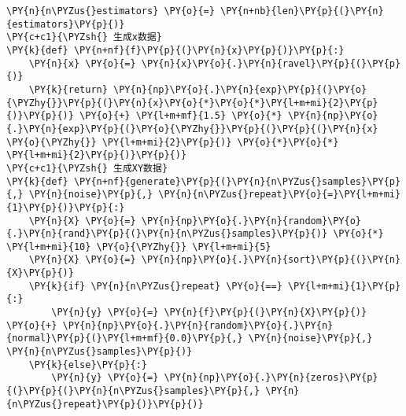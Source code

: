 \begin{Verbatim}[commandchars=\\\{\}]
\PY{n}{n\PYZus{}estimators} \PY{o}{=} \PY{n+nb}{len}\PY{p}{(}\PY{n}{estimators}\PY{p}{)}
\PY{c+c1}{\PYZsh{} 生成x数据}
\PY{k}{def} \PY{n+nf}{f}\PY{p}{(}\PY{n}{x}\PY{p}{)}\PY{p}{:}
    \PY{n}{x} \PY{o}{=} \PY{n}{x}\PY{o}{.}\PY{n}{ravel}\PY{p}{(}\PY{p}{)}
    \PY{k}{return} \PY{n}{np}\PY{o}{.}\PY{n}{exp}\PY{p}{(}\PY{o}{\PYZhy{}}\PY{p}{(}\PY{n}{x}\PY{o}{*}\PY{o}{*}\PY{l+m+mi}{2}\PY{p}{)}\PY{p}{)} \PY{o}{+} \PY{l+m+mf}{1.5} \PY{o}{*} \PY{n}{np}\PY{o}{.}\PY{n}{exp}\PY{p}{(}\PY{o}{\PYZhy{}}\PY{p}{(}\PY{p}{(}\PY{n}{x} \PY{o}{\PYZhy{}} \PY{l+m+mi}{2}\PY{p}{)} \PY{o}{*}\PY{o}{*} \PY{l+m+mi}{2}\PY{p}{)}\PY{p}{)}
\PY{c+c1}{\PYZsh{} 生成XY数据}
\PY{k}{def} \PY{n+nf}{generate}\PY{p}{(}\PY{n}{n\PYZus{}samples}\PY{p}{,} \PY{n}{noise}\PY{p}{,} \PY{n}{n\PYZus{}repeat}\PY{o}{=}\PY{l+m+mi}{1}\PY{p}{)}\PY{p}{:}
    \PY{n}{X} \PY{o}{=} \PY{n}{np}\PY{o}{.}\PY{n}{random}\PY{o}{.}\PY{n}{rand}\PY{p}{(}\PY{n}{n\PYZus{}samples}\PY{p}{)} \PY{o}{*} \PY{l+m+mi}{10} \PY{o}{\PYZhy{}} \PY{l+m+mi}{5}
    \PY{n}{X} \PY{o}{=} \PY{n}{np}\PY{o}{.}\PY{n}{sort}\PY{p}{(}\PY{n}{X}\PY{p}{)}
    \PY{k}{if} \PY{n}{n\PYZus{}repeat} \PY{o}{==} \PY{l+m+mi}{1}\PY{p}{:}
        \PY{n}{y} \PY{o}{=} \PY{n}{f}\PY{p}{(}\PY{n}{X}\PY{p}{)} \PY{o}{+} \PY{n}{np}\PY{o}{.}\PY{n}{random}\PY{o}{.}\PY{n}{normal}\PY{p}{(}\PY{l+m+mf}{0.0}\PY{p}{,} \PY{n}{noise}\PY{p}{,} \PY{n}{n\PYZus{}samples}\PY{p}{)}
    \PY{k}{else}\PY{p}{:}
        \PY{n}{y} \PY{o}{=} \PY{n}{np}\PY{o}{.}\PY{n}{zeros}\PY{p}{(}\PY{p}{(}\PY{n}{n\PYZus{}samples}\PY{p}{,} \PY{n}{n\PYZus{}repeat}\PY{p}{)}\PY{p}{)}


\end{Verbatim}

